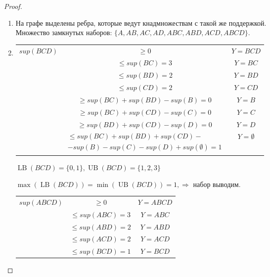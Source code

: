 \documentclass[12pt,a4paper]{article}
\DeclareMathOperator{\LB}{LB}
\DeclareMathOperator{\UB}{UB}
\begin{document}
\begin{proof} \hfill
  \begin{enumerate}[label=\Alph*.]
    \item На графе выделены ребра, которые ведут кнадмножествам с
    такой же поддержкой.\\
    Множество замкнутых наборов:
    $\{A, AB, AC, AD, ABC, ABD, ACD, ABCD\}$.
    \item
    \renewcommand{\arraystretch}{1.5} \begin{tabular}[t]{|c|c|c|}
      \hline
      \multirow{8}{*}{\(sup(BCD)\)}
      & $\ge 0$           & $Y = BCD$ \\\cline{2-3}
      & $\le sup(BC) = 3$ & $Y = BC$ \\\cline{2-3}
      & $\le sup(BD) = 2$ & $Y = BD$ \\\cline{2-3}
      & $\le sup(CD) = 2$ & $Y = CD$ \\\cline{2-3}
      & $\ge sup(BC) + sup(BD) - sup(B) = 0$ & $Y = B$ \\\cline{2-3}
      & $\ge sup(BC) + sup(CD) - sup(C) = 0$ & $Y = C$ \\\cline{2-3}
      & $\ge sup(BD) + sup(CD) - sup(D) = 0$ & $Y = D$ \\\cline{2-3}
      & $\begin{array}{lcl} \le sup(BC) + sup(BD) + sup(CD) - \\
        -sup(B) - sup(C) - sup(D) + sup(\emptyset) = 1\end{array}$ & $Y = \emptyset$ \\
      \hline
    \end{tabular}
    \renewcommand{\arraystretch}{1}

    $\LB(BCD)=\{0, 1\}, \UB(BCD)=\{1, 2, 3\}$

    $\max(\LB(BCD)) = \min(\UB(BCD)) = 1, \Rightarrow$ набор выводим.

    \renewcommand{\arraystretch}{1.5} \begin{tabular}[t]{|c|c|c|}
      \hline
      \multirow{16}{*}{\(sup(ABCD)\)}
      & $\ge 0$            & $Y = ABCD$ \\\cline{2-3}

      & $\le sup(ABC) = 3$ & $Y = ABC$ \\\cline{2-3}
      & $\le sup(ABD) = 2$ & $Y = ABD$ \\\cline{2-3}
      & $\le sup(ACD) = 2$ & $Y = ACD$ \\\cline{2-3}
      & $\le sup(BCD) = 1$ & $Y = BCD$ \\\cline{2-3}
      

\end{tabular}
\end{enumerate}
\end{proof}
\end{document}
